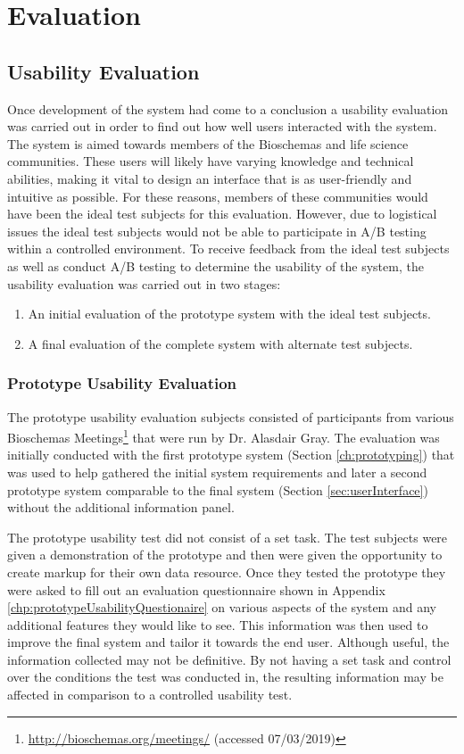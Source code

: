 \chapter{Evaluation}

\section{Usability Evaluation}
{
Once development of the system had come to a conclusion a usability evaluation was carried out in order to find out how well users interacted with the system. The system is aimed towards members of the Bioschemas and life science communities. These users will likely have varying knowledge and technical abilities, making it vital to design an interface that is as user-friendly and intuitive as possible. For these reasons, members of these communities would have been the ideal test subjects for this evaluation. However, due to logistical issues the ideal test subjects would not be able to participate in A/B testing within a controlled environment. To receive feedback from the ideal test subjects as well as conduct A/B testing to determine the usability of the system, the usability evaluation was carried out in two stages:


{
\begin{enumerate}
    \item An initial evaluation of the prototype system with the ideal test subjects.
    \item A final evaluation of the complete system with alternate test subjects.
\end{enumerate}
}

\subsection{Prototype Usability Evaluation}\label{sec:prototyUsability}
The prototype usability evaluation subjects consisted of participants from various Bioschemas Meetings\footnote{\url{http://bioschemas.org/meetings/} (accessed 07/03/2019)} that were run by Dr. Alasdair Gray. The evaluation was initially conducted with the first prototype system (Section \ref{ch:prototyping}) that was used to help gathered the initial system requirements and later a second prototype system comparable to the final system (Section \ref{sec:userInterface}) without the additional information panel.

}

The prototype usability test did not consist of a set task. The test subjects were given a demonstration of the prototype and then were given the opportunity to create markup for their own data resource. Once they tested the prototype they were asked to fill out an evaluation questionnaire shown in Appendix \ref{chp:prototypeUsabilityQuestionaire} on various aspects of the system and any additional features they would like to see. This information was then used to improve the final system and tailor it towards the end user. Although useful, the information collected may not be definitive. By not having a set task and control over the conditions the test was conducted in, the resulting information may be affected in comparison to a controlled usability test.

